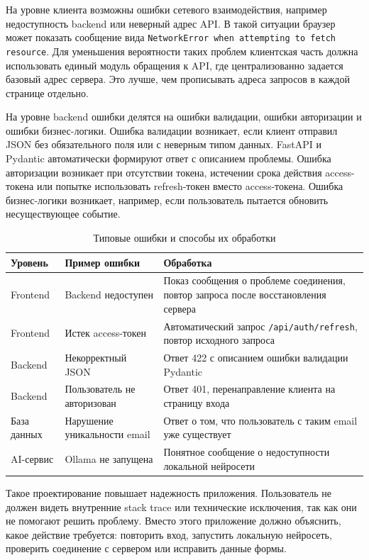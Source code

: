\documentclass[14pt,a4paper]{extreport}
\begin{document}
На уровне клиента возможны ошибки сетевого взаимодействия, например недоступность backend или неверный адрес API. В такой ситуации браузер может показать сообщение вида \texttt{NetworkError when attempting to fetch resource}. Для уменьшения вероятности таких проблем клиентская часть должна использовать единый модуль обращения к API, где централизованно задается базовый адрес сервера. Это лучше, чем прописывать адреса запросов в каждой странице отдельно.

На уровне backend ошибки делятся на ошибки валидации, ошибки авторизации и ошибки бизнес-логики. Ошибка валидации возникает, если клиент отправил JSON без обязательного поля или с неверным типом данных. FastAPI и Pydantic автоматически формируют ответ с описанием проблемы. Ошибка авторизации возникает при отсутствии токена, истечении срока действия access-токена или попытке использовать refresh-токен вместо access-токена. Ошибка бизнес-логики возникает, например, если пользователь пытается обновить несуществующее событие.

\begin{longtable}{|p{}|p{}|p{}|}
\caption{Типовые ошибки и способы их обработки}\\
\hline
\textbf{Уровень} & \textbf{Пример ошибки} & \textbf{Обработка}\\
\hline
Frontend & Backend недоступен & Показ сообщения о проблеме соединения, повтор запроса после восстановления сервера\\
\hline
Frontend & Истек access-токен & Автоматический запрос \texttt{/api/auth/refresh}, повтор исходного запроса\\
\hline
Backend & Некорректный JSON & Ответ 422 с описанием ошибки валидации Pydantic\\
\hline
Backend & Пользователь не авторизован & Ответ 401, перенаправление клиента на страницу входа\\
\hline
База данных & Нарушение уникальности email & Ответ о том, что пользователь с таким email уже существует\\
\hline
AI-сервис & Ollama не запущена & Понятное сообщение о недоступности локальной нейросети\\
\hline
\end{longtable}

Такое проектирование повышает надежность приложения. Пользователь не должен видеть внутренние stack trace или технические исключения, так как они не помогают решить проблему. Вместо этого приложение должно объяснить, какое действие требуется: повторить вход, запустить локальную нейросеть, проверить соединение с сервером или исправить данные формы.
\end{document}

